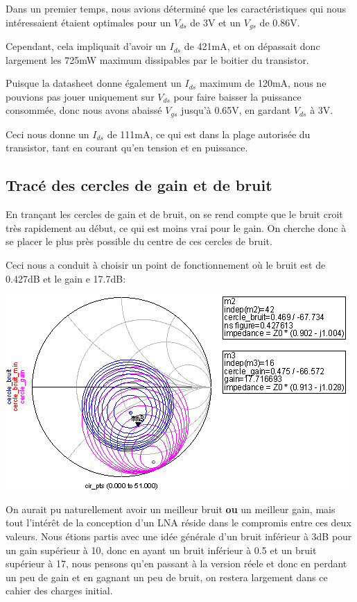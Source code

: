 \documentclass[12pt]{article}
\begin{document}
Dans un premier temps, nous avions déterminé que les caractéristiques qui nous intéressaient étaient optimales pour un $V_{ds}$ de 3V et un $V_{gs}$ de 0.86V.

Cependant, cela impliquait d’avoir un $I_{ds}$ de 421mA, et on dépassait donc largement les 725mW maximum dissipables par le boitier du transistor.

Puisque la datasheet donne également un $I_{ds}$ maximum de 120mA, nous ne pouvions pas jouer uniquement sur $V_{ds}$ pour faire baisser la puissance consommée, donc nous avons abaissé $V_{gs}$ jusqu’à 0.65V, en gardant $V_{ds}$ à 3V.

Ceci nous donne un $I_{ds}$ de 111mA, ce qui est dans la plage autorisée du transistor, tant en courant qu’en tension et en puissance.

\subsection{Tracé des cercles de gain et de bruit}
En trançant les cercles de gain et de bruit, on se rend compte que le bruit croit très rapidement au début, ce qui est moins vrai pour le gain. On cherche donc à se placer le plus près possible du centre de ces cercles de bruit.

Ceci nous a conduit à choisir un point de fonctionnement où le bruit est de 0.427dB et le gain e 17.7dB:

\begin{center}
\includegraphics[width=\linewidth]{img/cercles}
\end{center}

On aurait pu naturellement avoir un meilleur bruit \textbf{ou} un meilleur gain, mais tout l’intérêt de la conception d’un LNA réside dans le compromis entre ces deux valeurs. Nous étions partis avec une idée générale d’un bruit inférieur à 3dB pour un gain supérieur à 10, donc en ayant un bruit inférieur à 0.5 et un bruit supérieur à 17, nous pensons qu’en passant à la version réele et donc en perdant un peu de gain et en gagnant un peu de bruit, on restera largement dans ce cahier des charges initial.
\end{document}
